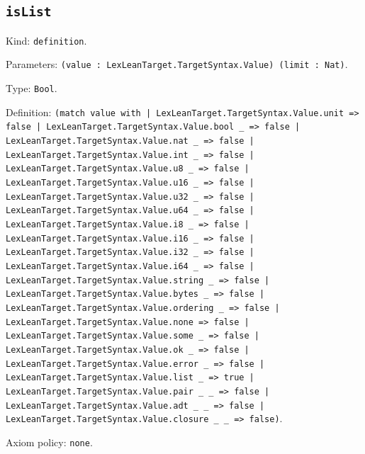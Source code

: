 \documentclass[11pt]{article}
\begin{document}
\subsection*{\texttt{isList}}
\noindent Kind: \texttt{definition}.\par
\noindent Parameters: \texttt{(value : LexLeanTarget.TargetSyntax.Value) (limit : Nat)}.\par
\noindent Type: \texttt{Bool}.\par
\noindent Definition: \texttt{(match value with | LexLeanTarget.TargetSyntax.Value.unit => false | LexLeanTarget.TargetSyntax.Value.bool \_ => false | LexLeanTarget.TargetSyntax.Value.nat \_ => false | LexLeanTarget.TargetSyntax.Value.int \_ => false | LexLeanTarget.TargetSyntax.Value.u8 \_ => false | LexLeanTarget.TargetSyntax.Value.u16 \_ => false | LexLeanTarget.TargetSyntax.Value.u32 \_ => false | LexLeanTarget.TargetSyntax.Value.u64 \_ => false | LexLeanTarget.TargetSyntax.Value.i8 \_ => false | LexLeanTarget.TargetSyntax.Value.i16 \_ => false | LexLeanTarget.TargetSyntax.Value.i32 \_ => false | LexLeanTarget.TargetSyntax.Value.i64 \_ => false | LexLeanTarget.TargetSyntax.Value.string \_ => false | LexLeanTarget.TargetSyntax.Value.bytes \_ => false | LexLeanTarget.TargetSyntax.Value.ordering \_ => false | LexLeanTarget.TargetSyntax.Value.none => false | LexLeanTarget.TargetSyntax.Value.some \_ => false | LexLeanTarget.TargetSyntax.Value.ok \_ => false | LexLeanTarget.TargetSyntax.Value.error \_ => false | LexLeanTarget.TargetSyntax.Value.list \_ => true | LexLeanTarget.TargetSyntax.Value.pair \_ \_ => false | LexLeanTarget.TargetSyntax.Value.adt \_ \_ => false | LexLeanTarget.TargetSyntax.Value.closure \_ \_ => false)}.\par
\noindent Axiom policy: \texttt{none}.\par
\end{document}
